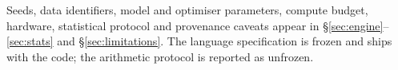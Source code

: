 \documentclass{article}
\begin{document}
Seeds, data identifiers, model and optimiser parameters, compute budget, hardware,
statistical protocol and provenance caveats appear in
\S\ref{sec:engine}--\ref{sec:stats} and \S\ref{sec:limitations}. The language
specification is frozen and ships with the code; the arithmetic protocol is
reported as unfrozen.

%
%

%
%
%



\appendix

\end{document}
